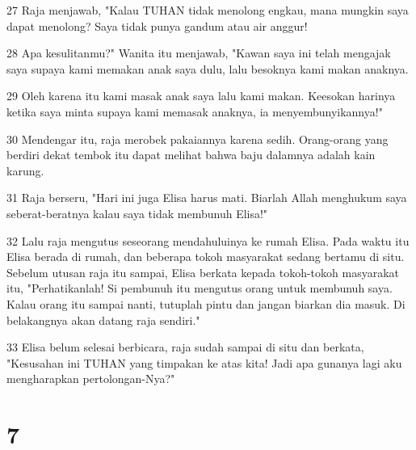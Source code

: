 \par 27 Raja menjawab, "Kalau TUHAN tidak menolong engkau, mana mungkin saya dapat menolong? Saya tidak punya gandum atau air anggur!
\par 28 Apa kesulitanmu?" Wanita itu menjawab, "Kawan saya ini telah mengajak saya supaya kami memakan anak saya dulu, lalu besoknya kami makan anaknya.
\par 29 Oleh karena itu kami masak anak saya lalu kami makan. Keesokan harinya ketika saya minta supaya kami memasak anaknya, ia menyembunyikannya!"
\par 30 Mendengar itu, raja merobek pakaiannya karena sedih. Orang-orang yang berdiri dekat tembok itu dapat melihat bahwa baju dalamnya adalah kain karung.
\par 31 Raja berseru, "Hari ini juga Elisa harus mati. Biarlah Allah menghukum saya seberat-beratnya kalau saya tidak membunuh Elisa!"
\par 32 Lalu raja mengutus seseorang mendahuluinya ke rumah Elisa. Pada waktu itu Elisa berada di rumah, dan beberapa tokoh masyarakat sedang bertamu di situ. Sebelum utusan raja itu sampai, Elisa berkata kepada tokoh-tokoh masyarakat itu, "Perhatikanlah! Si pembunuh itu mengutus orang untuk membunuh saya. Kalau orang itu sampai nanti, tutuplah pintu dan jangan biarkan dia masuk. Di belakangnya akan datang raja sendiri."
\par 33 Elisa belum selesai berbicara, raja sudah sampai di situ dan berkata, "Kesusahan ini TUHAN yang timpakan ke atas kita! Jadi apa gunanya lagi aku mengharapkan pertolongan-Nya?"

\chapter{7}

